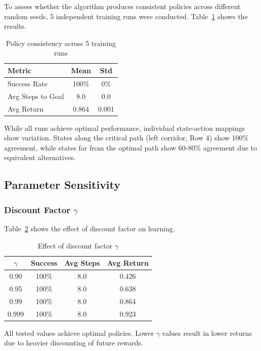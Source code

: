 \documentclass[letterpaper]{article}
\begin{document}
To assess whether the algorithm produces consistent policies across different random seeds, 5 independent training runs were conducted. Table~\ref{tab:consistency} shows the results.

\begin{table}[t]
\centering
\caption{Policy consistency across 5 training runs}
\label{tab:consistency}
\begin{tabular}{@{}lcc@{}}
\toprule
Metric & Mean & Std \\
\midrule
Success Rate & 100\% & 0\% \\
Avg Steps to Goal & 8.0 & 0.0 \\
Avg Return & 0.864 & 0.001 \\
\bottomrule
\end{tabular}
\end{table}

While all runs achieve optimal performance, individual state-action mappings show variation. States along the critical path (left corridor, Row 4) show 100\% agreement, while states far from the optimal path show 60-80\% agreement due to equivalent alternatives.

\subsection{Parameter Sensitivity}

\subsubsection{Discount Factor $\gamma$}

Table~\ref{tab:gamma} shows the effect of discount factor on learning.

\begin{table}[t]
\centering
\caption{Effect of discount factor $\gamma$}
\label{tab:gamma}
\begin{tabular}{@{}cccc@{}}
\toprule
$\gamma$ & Success & Avg Steps & Avg Return \\
\midrule
0.90 & 100\% & 8.0 & 0.426 \\
0.95 & 100\% & 8.0 & 0.638 \\
0.99 & 100\% & 8.0 & 0.864 \\
0.999 & 100\% & 8.0 & 0.923 \\
\bottomrule
\end{tabular}
\end{table}

All tested values achieve optimal policies. Lower $\gamma$ values result in lower returns due to heavier discounting of future rewards.
\end{document}
